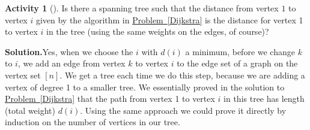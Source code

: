 \documentclass[10pt,]{book}
\theoremstyle{plain}
\theoremstyle{definition}
\newtheorem{activity}[project]{Activity}
\numberwithin{equation}{chapter}
\begin{document}
\begin{activity}[]\label{activity-111}
Is there a spanning tree such that the distance from vertex \(1\) to vertex \(i\) given by the algorithm in \hyperref[Dijkstra]{Problem~\ref{Dijkstra}} is the distance for vertex 1 to vertex \(i\) in the tree (using the same weights on the edges, of course)?%
\par\medskip\noindent%
\textbf{Solution.}\quad Yes, when we choose the \(i\) with \(d(i)\) a minimum, before we change \(k\) to \(i\), we add an edge from vertex \(k\) to vertex \(i\) to the edge set of a graph on the vertex set \([n]\). We get a tree each time we do this step, because we are adding a vertex of degree 1 to a smaller tree. We essentially proved in the solution to \hyperref[Dijkstra]{Problem~\ref{Dijkstra}} that the path from vertex 1 to vertex \(i\) in this tree has length (total weight) \(d(i)\). Using the same approach we could prove it directly by induction on the number of vertices in our tree.%
\end{activity}
\typeout{************************************************}
\typeout{************************************************}
\end{document}
